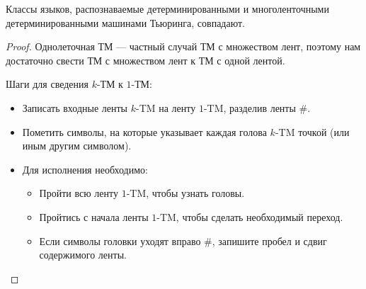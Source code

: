     \begin{Thm}
    Классы языков, распознаваемые детерминированными и многоленточными детерминированными машинами Тьюринга, совпадают.
    \end{Thm}
    \begin{proof}
        \par Однолеточная ТМ --- частный случай ТМ с множеством лент, поэтому нам достаточно свести ТМ с множеством лент к ТМ с одной лентой.
        \par Шаги для сведения $k$-ТМ к $1$-ТМ:
        \begin{itemize}
            \item Записать входные ленты $k$-TM на ленту $1$-TM, разделив ленты \#.
            \item Пометить символы, на которые указывает каждая голова $k$-TM точкой (или иным другим символом).
            \item Для исполнения необходимо:
                \begin{itemize}
                    \item Пройти всю ленту $1$-TM, чтобы узнать головы.
                    \item Пройтись с начала ленты $1$-TM, чтобы сделать необходимый переход.
                    \item Если символы головки уходят вправо \#, запишите пробел и сдвиг содержимого ленты.
                \end{itemize}
        \end{itemize}
    \end{proof}

        
